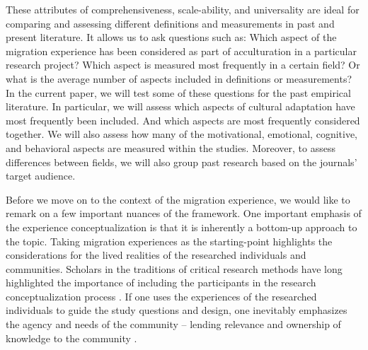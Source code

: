 \documentclass[man, 12pt, a4paper]{apa7}
\begin{document}
These attributes of comprehensiveness, scale-ability, and universality are ideal for comparing and assessing different definitions and measurements in past and present literature. It allows us to ask questions such as: Which aspect of the migration experience has been considered as part of acculturation in a particular research project? Which aspect is measured most frequently in a certain field? Or what is the average number of aspects included in definitions or measurements? 
In the current paper, we will test some of these questions for the past empirical literature. In particular, we will assess which aspects of cultural adaptation have most frequently been included. And which aspects are most frequently considered together. We will also assess how many of the motivational, emotional, cognitive, and behavioral aspects are measured within the studies. Moreover, to assess differences between fields, we will also group past research based on the journals' target audience. 

Before we move on to the context of the migration experience, we would like to remark on a few important nuances of the framework. One important emphasis of the experience conceptualization is that it is inherently a bottom-up approach to the topic. Taking migration experiences as the starting-point highlights the considerations for the lived realities of the researched individuals and communities. Scholars in the traditions of critical research methods have long highlighted the importance of including the participants in the research conceptualization process \citep[e.g.,][]{Kovach2009}. If one uses the experiences of the researched individuals to guide the study questions and design, one inevitably emphasizes the agency and needs of the community -- lending relevance and ownership of knowledge to the community \citep[e.g., ][]{Schmidt2021}.
\end{document}
